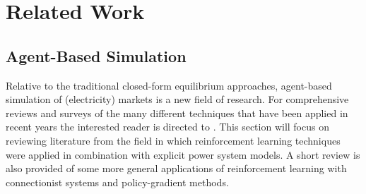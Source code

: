 \chapter{Related Work}
\label{ch:related_work}
\label{sec:related}

\section{Agent-Based Simulation}
Relative to the traditional closed-form equilibrium approaches, agent-based
simulation of (electricity) markets is a new field of research.  For
comprehensive reviews and surveys of the many different techniques that have
been applied in recent years the interested reader is directed to
\cite{anke:2008,tesfatsi:handbook,visud:thesis}.  This section will focus on
reviewing literature from the field in which reinforcement learning techniques
were applied in combination with explicit power system models.  A short review
is also provided of some more general applications of reinforcement learning
with connectionist systems and policy-gradient methods.

%
%

